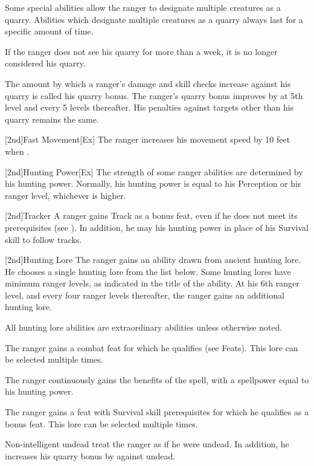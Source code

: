 Some special abilities allow the ranger to designate multiple creatures as a quarry.
Abilities which designate multiple creatures as a quarry always last for a specific amount of time.

If the ranger does not see his quarry for more than a week, it is no longer considered his quarry.

\par The amount by which a ranger's damage and skill checks increase against his quarry is called his quarry bonus.
The ranger's quarry bonus improves by  at 5th level and every 5 levels thereafter.
His penalties against targets other than his quarry remains the same.

[2nd]{Fast Movement}[Ex]
The ranger increases his movement speed by 10 feet when \unencumbered.

[2nd]{Hunting Power}[Ex]
The strength of some ranger abilities are determined by his hunting power.
Normally, his hunting power is equal to his Perception or his ranger level, whichever is higher.

[2nd]{Tracker}
A ranger gains Track as a bonus feat, even if he does not meet its prerequisites (see ).
In addition, he may his hunting power in place of his Survival skill to follow tracks.

[2nd]{Hunting Lore}
The ranger gains an ability drawn from ancient hunting lore.
He chooses a single hunting lore from the list below.
Some hunting lores have minimum ranger levels, as indicated in the title of the ability.
At his 6th ranger level, and every four ranger levels thereafter, the ranger gains an additional hunting lore.

All hunting lore abilities are extraordinary abilities unless otherwise noted.

    The ranger gains a combat feat for which he qualifies (see Feats).
    This lore can be selected multiple times.

    The ranger continuously gains the benefits of the  spell, with a spellpower equal to his hunting power.

    The ranger gains a feat with Survival skill prerequisites for which he qualifies as a bonus feat.
    This lore can be selected multiple times.

    Non-intelligent undead treat the ranger as if he were undead.
    In addition, he increases his quarry bonus by  against undead.

